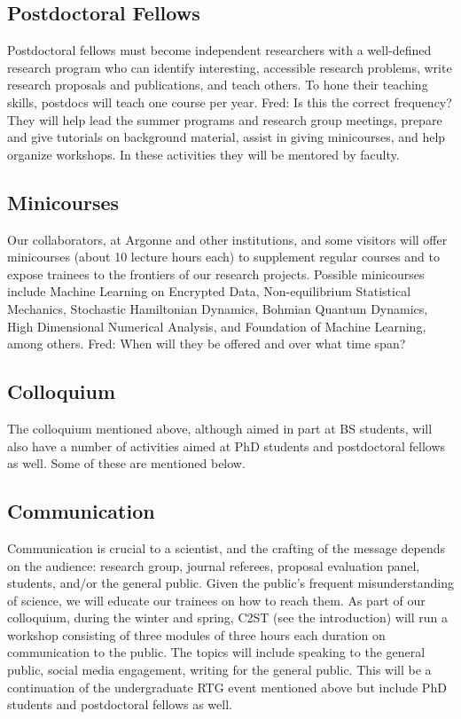 \documentclass[11pt]{NSFamsart}
\newcommand{\FredNote}[1]{{\color{blue} Fred: #1}}
\begin{document}
\subsection*{Postdoctoral Fellows}
Postdoctoral fellows must become independent researchers with a well-defined research program who can identify interesting, accessible research problems, write research proposals and publications, and teach others.  To hone their teaching skills, postdocs will teach one course per year.  \FredNote{Is this the correct frequency?}  They will help lead the summer programs and research group meetings, prepare and give tutorials on background material, assist in giving minicourses, and help organize workshops.  In these activities they will be mentored by faculty.

\subsection*{Minicourses}
Our collaborators, at Argonne and other institutions, and some visitors will offer minicourses (about 10 lecture hours each) to supplement regular courses and to expose trainees to the frontiers of our research projects. Possible minicourses include  Machine Learning on Encrypted Data,  Non-equilibrium Statistical Mechanics,  Stochastic Hamiltonian Dynamics, Bohmian Quantum Dynamics, High Dimensional Numerical Analysis, and Foundation of Machine Learning, among others. \FredNote{When will they be offered and over what time span?}

\subsection*{Colloquium} The colloquium mentioned above, although aimed in part at BS students, will also have a number of activities aimed at PhD students and postdoctoral fellows as well.  Some of these are mentioned below.

\subsection*{Communication}
Communication is crucial to a scientist, and the crafting of the message depends on the audience:  research group, journal referees, proposal evaluation panel, students, and/or the general public.  Given the public's frequent misunderstanding of science, we will educate our trainees on how to reach them.  As part of our colloquium, during the winter and spring, C2ST (see the introduction) will run a workshop consisting of three modules of three hours each duration on communication to the public.  The topics will include speaking to the general public, social media engagement, writing for the general public.  This will be a continuation of the undergraduate RTG event mentioned above but include PhD students and postdoctoral fellows as well.
\end{document}
